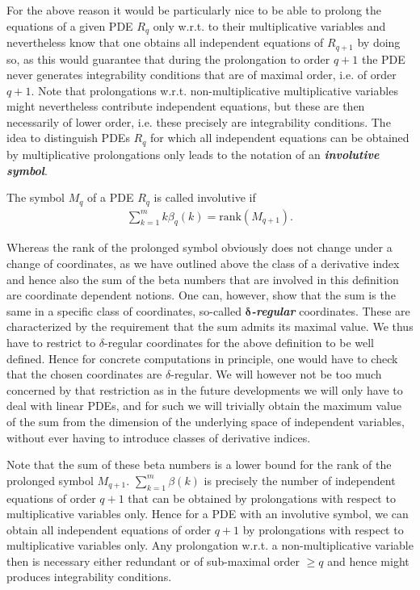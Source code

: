 For the above reason it would be particularly nice to be able to prolong the equations of a given PDE $R_q$ only w.r.t. to their multiplicative variables and nevertheless know that one obtains all independent equations of $R_{q+1}$ by doing so, as this would  guarantee that during the prolongation to order $q+1$ the PDE never generates integrability conditions that are of maximal order, i.e. of order $q+1$.
Note that prolongations w.r.t. non-multiplicative multiplicative variables might nevertheless contribute independent equations, but these are then necessarily of lower order, i.e. these precisely are integrability conditions. The idea to distinguish PDEs $R_q$ for which all independent equations can be obtained by multiplicative prolongations only leads to the notation of an \textit{\textbf{involutive symbol}}. 
\begin{definition}
The symbol $M_q$ of a PDE $R_q$ is called involutive if 
\begin{align}\label{sumBeta}
    \sum_{k=1}^m k\beta_q(k) = \mathrm{rank}(M_{q+1}).
\end{align}
\end{definition}
\begin{remark}
Whereas the rank of the prolonged symbol obviously does not change under a change of coordinates,
as we have outlined above the class of a derivative index and hence also the sum of the beta numbers that are involved in this definition are coordinate dependent notions. One can, however, show that the sum is the same in a specific class of coordinates, so-called \textit{\textbf{$\boldsymbol{\delta}$-regular}} coordinates. These are characterized by the requirement that the sum admits its maximal value.
We thus have to restrict to $\delta$-regular coordinates for the above definition to be well defined.
Hence for concrete computations in principle, one would have to check that the chosen coordinates are $\delta$-regular.  We will however not be too much concerned by that restriction as in the future developments we will only have to deal with linear PDEs, and for such we will trivially obtain the maximum value of the sum from the dimension of the underlying space of independent variables, without ever having to introduce classes of derivative indices.
\end{remark}
Note that the sum of these beta numbers is a lower bound for the rank of the prolonged symbol $M_{q+1}$. $\sum_{k=1}^m \beta(k)$ is precisely the number of independent equations of order $q+1$ that can be obtained by prolongations with respect to multiplicative variables only.  
Hence for a PDE with an involutive symbol, we can obtain all independent equations of order $q+1$ by prolongations with respect to multiplicative variables only. Any prolongation w.r.t. a non-multiplicative variable then is necessary either redundant or of sub-maximal order $\geq q$ and hence might produces integrability conditions. 

